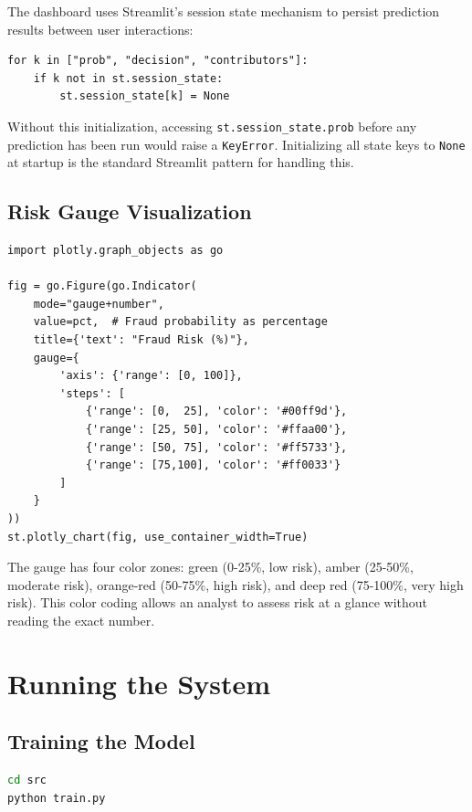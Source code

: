 The dashboard uses Streamlit's session state mechanism to persist prediction results between user interactions:

\begin{lstlisting}[caption={Session state initialization}, label={lst:sessionstate}]
for k in ["prob", "decision", "contributors"]:
    if k not in st.session_state:
        st.session_state[k] = None
\end{lstlisting}

Without this initialization, accessing \texttt{st.session\_state.prob} before any prediction has been run would raise a \texttt{KeyError}. Initializing all state keys to \texttt{None} at startup is the standard Streamlit pattern for handling this.

\subsection{Risk Gauge Visualization}

\begin{lstlisting}[caption={Plotly gauge chart for fraud risk display}, label={lst:gauge}]
import plotly.graph_objects as go

fig = go.Figure(go.Indicator(
    mode="gauge+number",
    value=pct,  # Fraud probability as percentage
    title={'text': "Fraud Risk (%)"},
    gauge={
        'axis': {'range': [0, 100]},
        'steps': [
            {'range': [0,  25], 'color': '#00ff9d'},
            {'range': [25, 50], 'color': '#ffaa00'},
            {'range': [50, 75], 'color': '#ff5733'},
            {'range': [75,100], 'color': '#ff0033'}
        ]
    }
))
st.plotly_chart(fig, use_container_width=True)
\end{lstlisting}

The gauge has four color zones: green (0-25\%, low risk), amber (25-50\%, moderate risk), orange-red (50-75\%, high risk), and deep red (75-100\%, very high risk). This color coding allows an analyst to assess risk at a glance without reading the exact number.

\section{Running the System}

\subsection{Training the Model}

\begin{lstlisting}[language=bash, caption={Commands to train the model}]
cd src
python train.py
\end{lstlisting}

